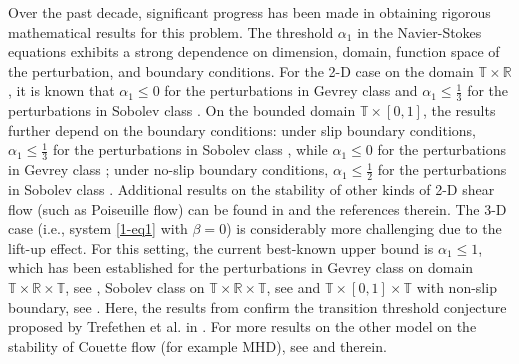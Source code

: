 \documentclass[11pt,reqno]{article}
\numberwithin{equation}{section}
\newcommand\R{{\mathbb R}}
\newcommand\T{{\mathbb T}}
\begin{document}
	Over the past decade, significant progress has been made in obtaining rigorous mathematical results for this problem. 
    The threshold $\alpha_1$ in the Navier-Stokes equations exhibits a strong dependence on dimension, domain, function space of the perturbation, and boundary conditions.
    For the 2-D case on the domain $\T\times\R$, it is known that $\alpha_1\leq 0$ for the perturbations in Gevrey class \cite{Bedrossian-Masmoudi-Vicol-2016, Li-Masmoudi-Zhao} and $\alpha_1\leq \frac13$ for the perturbations in Sobolev class \cite{Bedrossian-Wang-2018, MZ, WZ-2023}. 
    On the bounded domain $\T\times [0, 1]$, the results further depend on the boundary conditions: under slip boundary conditions, $\alpha_1\leq \frac13$ for the perturbations in Sobolev class \cite{WZ-2025}, while $\alpha_1\leq 0$ for the perturbations in Gevrey class \cite{Bedrossian-He-Iyer-Wang-2024}; under no-slip boundary conditions, $\alpha_1\leq \frac12$ for the perturbations in Sobolev class \cite{CLWZ}. Additional results on the stability of other kinds of 2-D shear flow
   (such as Poiseuille flow) can be found in \cite{Coti-Elgindi-Widmayer-2020, Ding-Lin-2022, Zotto-2023, CWZ-CMP} and the references therein. 
 The 3-D case (i.e., system \eqref{1-eq1} with $\beta=0$) is considerably more challenging due to the lift-up effect. 
    For this setting, the current best-known upper bound is $\alpha_1\leq 1$, which has been established for the perturbations in Gevrey class on domain $\T\times\R\times\T$, see \cite{Bedrossian-Germain-Masmoudi-2020, Bedrossian-Germain-Masmoudi-2022}, Sobolev class on $\T\times\R\times\T$, see 
     \cite{Bedrossian-Germain-Masmoudi-2017, WZ-cpam} and $\T\times[0, 1]\times\T$ with non-slip boundary, see \cite{CWZ-MAMS}.
    Here, the results from \cite{CWZ-MAMS, WZ-cpam} confirm the transition threshold conjecture proposed by Trefethen et al. in \cite{Trefethen}.  For more results on the other model on the stability of Couette flow (for example MHD), see \cite{Liss-2020, Rao-Zhang-Zi-2025} and therein. 
\end{document}
